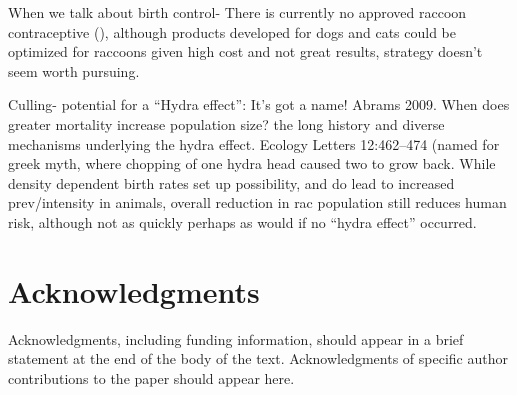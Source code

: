 \documentclass[11pt]{article}
\begin{document}
When we talk about birth control- There is currently no approved raccoon
contraceptive (), although products developed for dogs and cats could be
optimized for raccoons given high cost and not great results, strategy
doesn't seem worth pursuing.

Culling- potential for a ``Hydra effect'': It's got a name! Abrams 2009.
When does greater mortality increase population size? the long history
and diverse mechanisms underlying the hydra effect. Ecology Letters
12:462--474 (named for greek myth, where chopping of one hydra head
caused two to grow back. While density dependent birth rates set up
possibility, and do lead to increased prev/intensity in animals, overall
reduction in rac population still reduces human risk, although not as
quickly perhaps as would if no ``hydra effect'' occurred.

\section{Acknowledgments} 

Acknowledgments, including funding
information, should appear in a brief statement at the end of the body
of the text. Acknowledgments of specific author contributions to the
paper should appear here.






\end{document}
